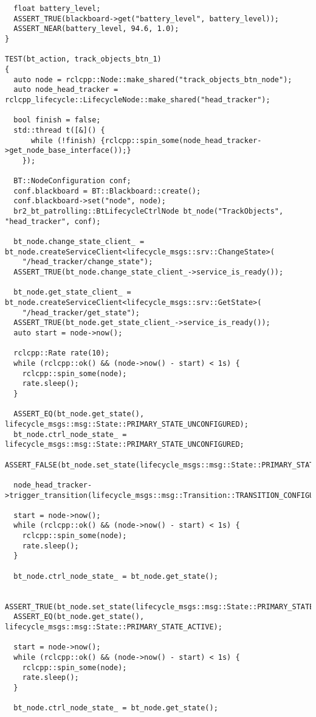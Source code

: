 \begin{tcolorbox}[sharp corners, colframe=gray!80, colback=LightGray, left=0pt, top=0pt, bottom=0pt, title=\texttt{br2\_bt\_patrolling/tests/bt\_action\_test.cpp}]
\begin{verbatim}
  float battery_level;
  ASSERT_TRUE(blackboard->get("battery_level", battery_level));
  ASSERT_NEAR(battery_level, 94.6, 1.0);
}

TEST(bt_action, track_objects_btn_1)
{
  auto node = rclcpp::Node::make_shared("track_objects_btn_node");
  auto node_head_tracker = rclcpp_lifecycle::LifecycleNode::make_shared("head_tracker");

  bool finish = false;
  std::thread t([&]() {
      while (!finish) {rclcpp::spin_some(node_head_tracker->get_node_base_interface());}
    });

  BT::NodeConfiguration conf;
  conf.blackboard = BT::Blackboard::create();
  conf.blackboard->set("node", node);
  br2_bt_patrolling::BtLifecycleCtrlNode bt_node("TrackObjects", "head_tracker", conf);

  bt_node.change_state_client_ = bt_node.createServiceClient<lifecycle_msgs::srv::ChangeState>(
    "/head_tracker/change_state");
  ASSERT_TRUE(bt_node.change_state_client_->service_is_ready());

  bt_node.get_state_client_ = bt_node.createServiceClient<lifecycle_msgs::srv::GetState>(
    "/head_tracker/get_state");
  ASSERT_TRUE(bt_node.get_state_client_->service_is_ready());
  auto start = node->now();

  rclcpp::Rate rate(10);
  while (rclcpp::ok() && (node->now() - start) < 1s) {
    rclcpp::spin_some(node);
    rate.sleep();
  }

  ASSERT_EQ(bt_node.get_state(), lifecycle_msgs::msg::State::PRIMARY_STATE_UNCONFIGURED);
  bt_node.ctrl_node_state_ = lifecycle_msgs::msg::State::PRIMARY_STATE_UNCONFIGURED;
  ASSERT_FALSE(bt_node.set_state(lifecycle_msgs::msg::State::PRIMARY_STATE_ACTIVE));

  node_head_tracker->trigger_transition(lifecycle_msgs::msg::Transition::TRANSITION_CONFIGURE);

  start = node->now();
  while (rclcpp::ok() && (node->now() - start) < 1s) {
    rclcpp::spin_some(node);
    rate.sleep();
  }

  bt_node.ctrl_node_state_ = bt_node.get_state();

  ASSERT_TRUE(bt_node.set_state(lifecycle_msgs::msg::State::PRIMARY_STATE_ACTIVE));
  ASSERT_EQ(bt_node.get_state(), lifecycle_msgs::msg::State::PRIMARY_STATE_ACTIVE);

  start = node->now();
  while (rclcpp::ok() && (node->now() - start) < 1s) {
    rclcpp::spin_some(node);
    rate.sleep();
  }

  bt_node.ctrl_node_state_ = bt_node.get_state();


\end{verbatim}
\end{tcolorbox}
